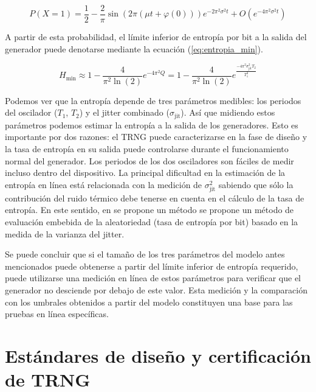             \begin{equation}
                P(X=1) = \frac{1}{2} - \frac{2}{\pi} \sin (2 \pi (\mu t + \varphi(0) ) ) e^{-2\pi^{2} \sigma^{2} t} + O(e^{-4\pi^{2} \sigma^{2} t})
                \label{eq:probabilidad}
            \end{equation}

            A partir de esta probabilidad, el límite inferior de entropía por bit a la salida del generador puede denotarse mediante la ecuación (\ref{eq:entropia_min}).

            \begin{equation}
                H_{\text{min}} \approx 1 - \frac{4}{\pi^{2} \ln (2)} e^{-4 \pi ^{2} Q} = 1 - \frac{4}{\pi^{2} \ln (2)} e^{ \frac{-4\pi^{2} \sigma_{\text{jit}}^{2} T_{2} }{T_{1}^{3}} }
                \label{eq:entropia_min}
            \end{equation}
            
            Podemos ver que la entropía depende de tres parámetros medibles: los periodos del oscilador ($T_{1}$, $T_{2}$) y el jitter combinado ($\sigma_{\text{jit}}$). Así que midiendo estos parámetros podemos estimar la entropía a la salida de los generadores. Esto es importante por dos razones: el TRNG puede caracterizarse en la fase de diseño y la tasa de entropía en su salida puede controlarse durante el funcionamiento normal del generador. Los periodos de los dos osciladores son fáciles de medir incluso dentro del dispositivo. La principal dificultad en la estimación de la entropía en línea está relacionada con la medición de $\sigma_{\text{jit}}^{2}$ sabiendo que sólo la contribución del ruido térmico debe tenerse en cuenta en el cálculo de la tasa de entropía. En este sentido, en \cite{Fischer2014} se propone un método se propone un método de evaluación embebida de la aleatoriedad (tasa de entropía por bit) basado en la medida de la varianza del jitter.

            Se puede concluir que si el tamaño de los tres parámetros del modelo antes mencionados puede obtenerse a partir del límite inferior de entropía requerido, puede utilizarse una medición en línea de estos parámetros para verificar que el generador no desciende por debajo de este valor. Esta medición y la comparación con los umbrales obtenidos a partir del modelo constituyen una base para las pruebas en línea específicas.



	
    \section{Estándares de diseño y certificación de TRNG}
	
